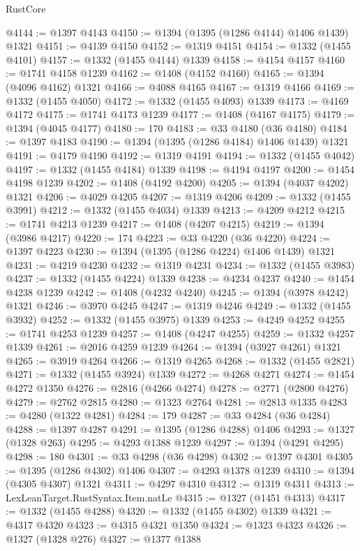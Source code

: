 \begin{lexlean}{RustCore}
\begin{coremodule}
@4144 := @1397 @4143
@4150 := @1394 (@1395 (@1286 @4144) @1406 @1439) @1321
@4151 := @4139 @4150
@4152 := @1319 @4151
@4154 := @1332 (@1455 @4101)
@4157 := @1332 (@1455 @4144) @1339
@4158 := @4154 @4157
@4160 := @1741 @4158 @1239
@4162 := @1408 (@4152 @4160)
@4165 := @1394 (@4096 @4162) @1321
@4166 := @4088 @4165
@4167 := @1319 @4166
@4169 := @1332 (@1455 @4050)
@4172 := @1332 (@1455 @4093) @1339
@4173 := @4169 @4172
@4175 := @1741 @4173 @1239
@4177 := @1408 (@4167 @4175)
@4179 := @1394 (@4045 @4177)
@4180 := 170
@4183 := @33 @4180 (@36 @4180)
@4184 := @1397 @4183
@4190 := @1394 (@1395 (@1286 @4184) @1406 @1439) @1321
@4191 := @4179 @4190
@4192 := @1319 @4191
@4194 := @1332 (@1455 @4042)
@4197 := @1332 (@1455 @4184) @1339
@4198 := @4194 @4197
@4200 := @1454 @4198 @1239
@4202 := @1408 (@4192 @4200)
@4205 := @1394 (@4037 @4202) @1321
@4206 := @4029 @4205
@4207 := @1319 @4206
@4209 := @1332 (@1455 @3991)
@4212 := @1332 (@1455 @4034) @1339
@4213 := @4209 @4212
@4215 := @1741 @4213 @1239
@4217 := @1408 (@4207 @4215)
@4219 := @1394 (@3986 @4217)
@4220 := 174
@4223 := @33 @4220 (@36 @4220)
@4224 := @1397 @4223
@4230 := @1394 (@1395 (@1286 @4224) @1406 @1439) @1321
@4231 := @4219 @4230
@4232 := @1319 @4231
@4234 := @1332 (@1455 @3983)
@4237 := @1332 (@1455 @4224) @1339
@4238 := @4234 @4237
@4240 := @1454 @4238 @1239
@4242 := @1408 (@4232 @4240)
@4245 := @1394 (@3978 @4242) @1321
@4246 := @3970 @4245
@4247 := @1319 @4246
@4249 := @1332 (@1455 @3932)
@4252 := @1332 (@1455 @3975) @1339
@4253 := @4249 @4252
@4255 := @1741 @4253 @1239
@4257 := @1408 (@4247 @4255)
@4259 := @1332 @4257 @1339
@4261 := @2016 @4259 @1239
@4264 := @1394 (@3927 @4261) @1321
@4265 := @3919 @4264
@4266 := @1319 @4265
@4268 := @1332 (@1455 @2821)
@4271 := @1332 (@1455 @3924) @1339
@4272 := @4268 @4271
@4274 := @1454 @4272 @1350
@4276 := @2816 (@4266 @4274)
@4278 := @2771 (@2800 @4276)
@4279 := @2762 @2815
@4280 := @1323 @2764
@4281 := @2813 @1335
@4283 := @4280 (@1322 @4281)
@4284 := 179
@4287 := @33 @4284 (@36 @4284)
@4288 := @1397 @4287
@4291 := @1395 (@1286 @4288) @1406
@4293 := @1327 (@1328 @263)
@4295 := @4293 @1388 @1239
@4297 := @1394 (@4291 @4295)
@4298 := 180
@4301 := @33 @4298 (@36 @4298)
@4302 := @1397 @4301
@4305 := @1395 (@1286 @4302) @1406
@4307 := @4293 @1378 @1239
@4310 := @1394 (@4305 @4307) @1321
@4311 := @4297 @4310
@4312 := @1319 @4311
@4313 := LexLeanTarget.RustSyntax.Item.natLe
@4315 := @1327 (@1451 @4313)
@4317 := @1332 (@1455 @4288)
@4320 := @1332 (@1455 @4302) @1339
@4321 := @4317 @4320
@4323 := @4315 @4321 @1350
@4324 := @1323 @4323
@4326 := @1327 (@1328 @276)
@4327 := @1377 @1388

\end{coremodule}
\end{lexlean}

